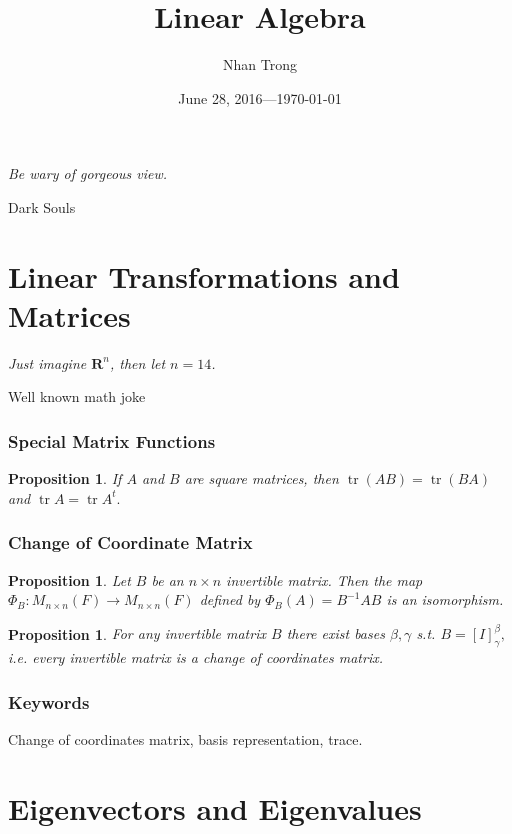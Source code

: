 \documentclass[12pt]{article}
\title{Linear Algebra}
\author{Nhan Trong}
\date{June 28, 2016---\today}
\theoremstyle{plain}
\newtheorem{proposition}[theorem]{Proposition}
\theoremstyle{definition}
\theoremstyle{remark}
\newcommand{\R}{\mathbf R}
\DeclareMathOperator{\tr}{tr}
\begin{document}
\maketitle

\epigraph{\textit{Be wary of gorgeous view.}}{Dark Souls}

\tableofcontents %

\part{Linear Transformations and Matrices}

\epigraph{\textit{Just imagine $\R^n$, then let $n = 14$.}}{Well known math joke}

\section{Special Matrix Functions}

\begin{proposition}\label{tracecommutative}
If $A$ and $B$ are square matrices, then $\tr(AB) = \tr(BA)$ and $\tr A = \tr A^t.$
\end{proposition}

\section{Change of Coordinate Matrix}

\begin{proposition}\label{matrixbasisrep}
Let $B$ be an $n \times n$ invertible matrix. Then the map $\Phi_B: M_{n\times n}(F) \longrightarrow M_{n\times n}(F)$ defined by $\Phi_B(A) = B^{-1} A B$ is an isomorphism.
\end{proposition}

\begin{proposition}
For any invertible matrix $B$ there exist bases $\beta, \gamma$ s.t. $B = [I]^\beta_\gamma,$ i.e. every invertible matrix is a change of coordinates matrix.
\end{proposition}

\section*{Keywords}

Change of coordinates matrix, basis representation, trace.

\part{Eigenvectors and Eigenvalues}
\end{document}
